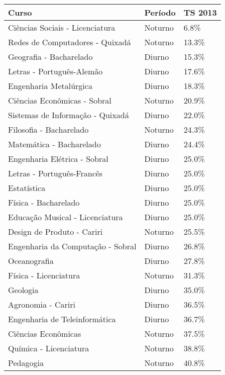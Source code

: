 \begin{tabular}{lll}
\toprule
                              Curso &  Período & TS 2013 \\
\midrule
    Ciências Sociais - Licenciatura &  Noturno &    6.8\% \\
    Redes de Computadores - Quixadá &  Noturno &   13.3\% \\
            Geografia - Bacharelado &   Diurno &   15.3\% \\
          Letras - Português-Alemão &   Diurno &   17.6\% \\
             Engenharia Metalúrgica &   Diurno &   18.3\% \\
       Ciências Econômicas - Sobral &  Noturno &   20.9\% \\
   Sistemas de Informação - Quixadá &   Diurno &   22.0\% \\
            Filosofia - Bacharelado &  Noturno &   24.3\% \\
           Matemática - Bacharelado &   Diurno &   24.4\% \\
       Engenharia Elétrica - Sobral &   Diurno &   25.0\% \\
         Letras - Português-Francês &   Diurno &   25.0\% \\
                        Estatística &   Diurno &   25.0\% \\
               Física - Bacharelado &   Diurno &   25.0\% \\
    Educação Musical - Licenciatura &   Diurno &   25.0\% \\
         Design de Produto - Cariri &  Noturno &   25.5\% \\
  Engenharia da Computação - Sobral &   Diurno &   26.8\% \\
                       Oceanografia &   Diurno &   27.8\% \\
              Física - Licenciatura &  Noturno &   31.3\% \\
                           Geologia &   Diurno &   35.0\% \\
                 Agronomia - Cariri &   Diurno &   36.5\% \\
      Engenharia de Teleinformática &   Diurno &   36.7\% \\
                Ciências Econômicas &  Noturno &   37.5\% \\
             Química - Licenciatura &  Noturno &   38.8\% \\
                          Pedagogia &  Noturno &   40.8\% \\

\end{tabular}
